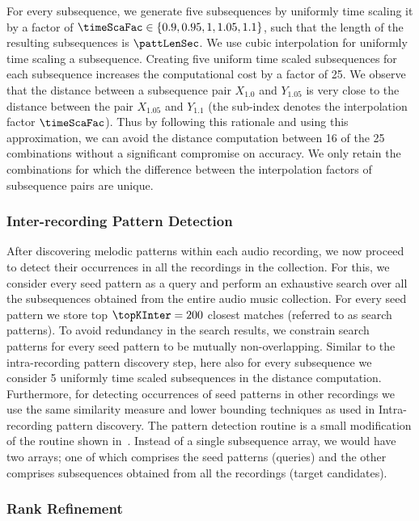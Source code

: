 For every subsequence, we generate five subsequences by uniformly time scaling it by a factor of $\timeScaFac \in \lbrace 0.9, 0.95, 1, 1.05, 1.1\rbrace$, such that the length of the resulting subsequences is $\pattLenSec$. We use cubic interpolation for uniformly time scaling a subsequence. Creating five uniform time scaled subsequences for each subsequence increases the computational cost by a factor of 25. We observe that the distance between a subsequence pair $X_{1.0}$ and $Y_{1.05}$ is very close to the distance between the pair $X_{1.05}$ and $Y_{1.1}$ (the sub-index denotes the interpolation factor $\timeScaFac$). Thus by following this rationale and using this approximation, we can avoid the distance computation between 16 of the 25 combinations without a significant compromise on accuracy. We only retain the combinations for which the difference between the interpolation factors of subsequence pairs are unique. 

\subsubsection{Inter-recording Pattern Detection}
\label{sec:inter_recording_pattern_search}

After discovering melodic patterns within each audio recording, we now proceed to detect their occurrences in all the recordings in the collection. For this, we consider every seed pattern as a query and perform an exhaustive search over all the subsequences obtained from the entire audio music collection. For every seed pattern we store top $\topKInter=200$ closest matches (referred to as search patterns). To avoid redundancy in the search results, we constrain search patterns for every seed pattern to be mutually non-overlapping. Similar to the intra-recording pattern discovery step, here also for every subsequence we consider 5 uniformly  time scaled subsequences in the distance computation. Furthermore, for detecting occurrences of seed patterns in other recordings we use the same similarity measure and lower bounding techniques as used in Intra-recording pattern discovery. The pattern detection routine is a small modification of the routine shown in~. Instead of a single subsequence array, we would have two arrays; one of which comprises the seed patterns (queries) and the other comprises subsequences obtained from all the recordings (target candidates). 

\subsubsection{Rank Refinement}
\label{sec:rankRefinement}

